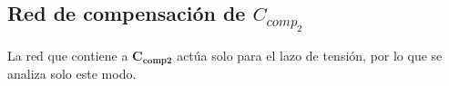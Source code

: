 




\clearpage


\subsection{Red de compensación de $C_{comp_{2}}$}

La red que contiene a $\bm{C_{comp2}}$ actúa solo para el lazo de tensión, por lo que se analiza solo este modo.





\clearpage


